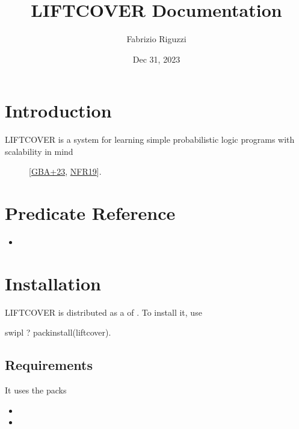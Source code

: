 \documentclass[letterpaper,10pt,english]{sphinxmanual}
\title{LIFTCOVER Documentation}
\date{Dec 31, 2023}
\author{Fabrizio Riguzzi}
\begin{document}
\pagestyle{empty}
\sphinxmaketitle
\pagestyle{plain}
\sphinxtableofcontents
\pagestyle{normal}
\label{\detokenize{index::doc}}



\chapter{Introduction}
\label{\detokenize{index:introduction}}\begin{description}
\item[{LIFTCOVER is a system for learning simple probabilistic logic programs with scalability in mind}] \leavevmode
\sphinxAtStartPar
{[}\hyperlink{cite.index:id7}{GBA+23}, \hyperlink{cite.index:id34}{NFR19}{]}.

\end{description}


\chapter{Predicate Reference}
\label{\detokenize{index:predicate-reference}}\begin{itemize}
\item {} 
\sphinxAtStartPar
{}

\end{itemize}


\chapter{Installation}
\label{\detokenize{index:installation}}
\sphinxAtStartPar
LIFTCOVER is distributed as a  of .
To install it, use

\begin{sphinxVerbatim}[commandchars=\\\{\}]
\PYGZdl{} swipl
?\PYGZhy{} pack\PYGZus{}install(liftcover).
\end{sphinxVerbatim}


\section{Requirements}
\label{\detokenize{index:requirements}}
\sphinxAtStartPar
It uses the packs
\begin{itemize}
\item {} 
\sphinxAtStartPar
{}

\item {} 
\sphinxAtStartPar
{}

\end{itemize}
\end{document}

